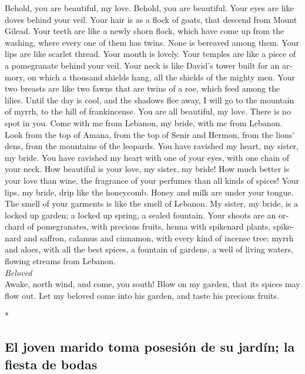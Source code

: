 \begin{paracol}{2}
\begin{otherlanguage}{english}
 Behold, you are beautiful, my love. Behold, you are
beautiful. Your eyes are like doves behind your veil. Your hair is as a
flock of goats, that descend from Mount Gilead.  Your
teeth are like a newly shorn flock, which have come up from the washing,
where every one of them has twins. None is bereaved among them.
 Your lips are like scarlet thread. Your mouth is lovely.
Your temples are like a piece of a pomegranate behind your veil.
 Your neck is like David's tower built for an armory, on
which a thousand shields hang, all the shields of the mighty men.
 Your two breasts are like two fawns that are twins of a
roe, which feed among the lilies.  Until the day is cool,
and the shadows flee away, I will go to the mountain of myrrh, to the
hill of frankincense.  You are all beautiful, my love.
There is no spot in you.  Come with me from Lebanon, my
bride, with me from Lebanon. Look from the top of Amana, from the top of
Senir and Hermon, from the lions' dens, from the mountains of the
leopards.  You have ravished my heart, my sister, my
bride. You have ravished my heart with one of your eyes, with one chain
of your neck.  How beautiful is your love, my sister, my
bride! How much better is your love than wine, the fragrance of your
perfumes than all kinds of spices!  Your lips, my bride,
drip like the honeycomb. Honey and milk are under your tongue. The smell
of your garments is like the smell of Lebanon.  My
sister, my bride, is a locked up garden; a locked up spring, a sealed
fountain.  Your shoots are an orchard of pomegranates,
with precious fruits, henna with spikenard plants, 
spikenard and saffron, calamus and cinnamon, with every kind of incense
tree; myrrh and aloes, with all the best spices,  a
fountain of gardens, a well of living waters, flowing streams from
Lebanon.\\
\emph{Beloved }\\
 Awake, north wind, and come, you south! Blow on my
garden, that its spices may flow out. Let my beloved come into his
garden, and taste his precious fruits.

\end{otherlanguage}

\switchcolumn[0]*

\hypertarget{el-joven-marido-toma-posesiuxf3n-de-su-jarduxedn-la-fiesta-de-bodas}{%
\subsection{El joven marido toma posesión de su jardín; la fiesta de
bodas}\label{el-joven-marido-toma-posesiuxf3n-de-su-jarduxedn-la-fiesta-de-bodas}}


\end{paracol}
